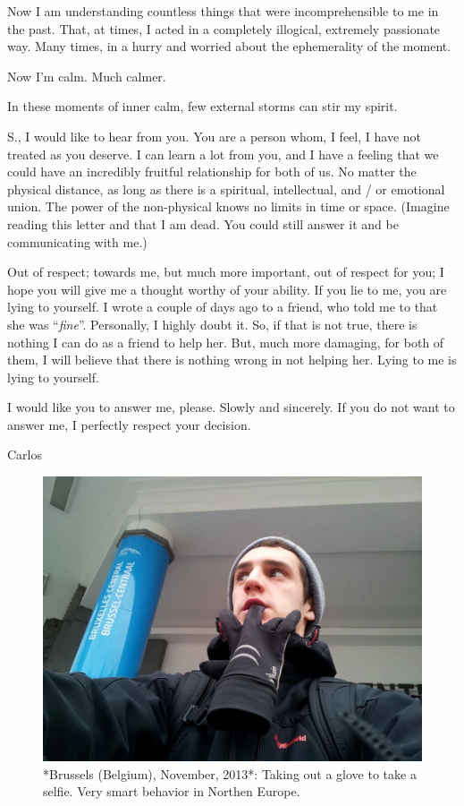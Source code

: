 \documentclass[]{book}
\begin{document}
Now I am understanding countless things that were incomprehensible to me in the past. That, at times, I acted in a completely illogical, extremely passionate way. Many times, in a hurry and worried about the ephemerality of the moment.

Now I'm calm. Much calmer.

In these moments of inner calm, few external storms can stir my spirit.

S., I would like to hear from you. You are a person whom, I feel, I have not treated as you deserve. I can learn a lot from you, and I have a feeling that we could have an incredibly fruitful relationship for both of us. No matter the physical distance, as long as there is a spiritual, intellectual, and / or emotional union. The power of the non-physical knows no limits in time or space. (Imagine reading this letter and that I am dead. You could still answer it and be communicating with me.)

Out of respect; towards me, but much more important, out of respect for you; I hope you will give me a thought worthy of your ability. If you lie to me, you are lying to yourself. I wrote a couple of days ago to a friend, who told me to that she was ``\emph{fine}''. Personally, I highly doubt it. So, if that is not true, there is nothing I can do as a friend to help her. But, much more damaging, for both of them, I will believe that there is nothing wrong in not helping her. Lying to me is lying to yourself.

I would like you to answer me, please. Slowly and sincerely. If you do not want to answer me, I perfectly respect your decision.

Carlos

\begin{figure}

{\centering \includegraphics[width=0.75\linewidth]{images/2014/glove} 

}

\caption{*Brussels (Belgium), November, 2013*: Taking out a glove to take a selfie. Very smart behavior in Northen Europe.}\label{fig:glove}
\end{figure}
\end{document}
